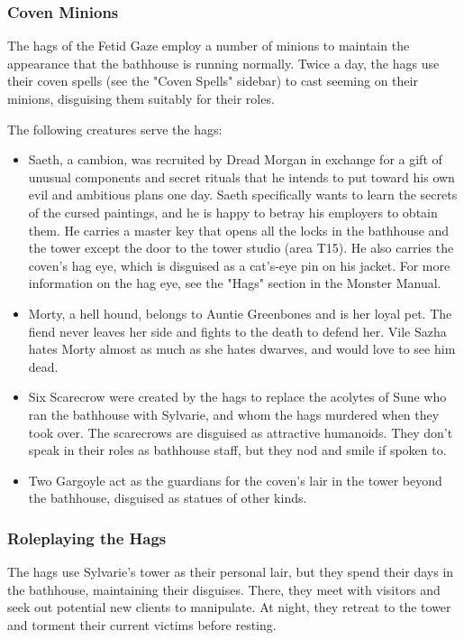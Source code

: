 \documentclass[10pt,a4paper,twoside,bg=print,twocolumn,openany,nodeprecatedcode]{dndbook}
\begin{document}
\subsubsection{Coven Minions}
The hags of the Fetid Gaze employ a number of minions to maintain the appearance that the bathhouse is running normally. Twice a day, the hags use their coven spells (see the "Coven Spells" sidebar) to cast seeming on their minions, disguising them suitably for their roles.

The following creatures serve the hags:


\begin{itemize}
\item Saeth, a cambion, was recruited by Dread Morgan in exchange for a gift of unusual components and secret rituals that he intends to put toward his own evil and ambitious plans one day. Saeth specifically wants to learn the secrets of the cursed paintings, and he is happy to betray his employers to obtain them. He carries a master key that opens all the locks in the bathhouse and the tower except the door to the tower studio (area T15). He also carries the coven's hag eye, which is disguised as a cat's-eye pin on his jacket. For more information on the hag eye, see the "Hags" section in the Monster Manual.
\item Morty, a hell hound, belongs to Auntie Greenbones and is her loyal pet. The fiend never leaves her side and fights to the death to defend her. Vile Sazha hates Morty almost as much as she hates dwarves, and would love to see him dead.
\item Six Scarecrow were created by the hags to replace the acolytes of Sune who ran the bathhouse with Sylvarie, and whom the hags murdered when they took over. The scarecrows are disguised as attractive humanoids. They don't speak in their roles as bathhouse staff, but they nod and smile if spoken to.
\item Two Gargoyle act as the guardians for the coven's lair in the tower beyond the bathhouse, disguised as statues of other kinds.
\end{itemize}

\subsubsection{Roleplaying the Hags}
The hags use Sylvarie's tower as their personal lair, but they spend their days in the bathhouse, maintaining their disguises. There, they meet with visitors and seek out potential new clients to manipulate. At night, they retreat to the tower and torment their current victims before resting.
\end{document}
